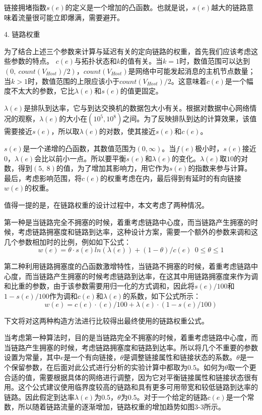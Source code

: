 链接拥堵指数$s(e)$的定义是一个增加的凸函数。也就是说，$s(e)$越大的链路意味着流量很可能立即爆满，需要避开。

4. 链路权重

为了结合上述三个参数来计算与延迟有关的定向链路的权重，首先我们应该考虑这些参数的特点。
$c(e)$与拓扑状态和$k$的值有关。当$k=1$时，数值范围可以达到$(0,\ count(V_{Host})/2)，count(V_{Host})$是网络中可能发起消息的主机节点数量；当$k>1$时，数值范围的上限应该小于$count(V_{Host})/2$。这意味着$c(e)$是一个幅度不太大的参数，它比$\lambda(e)$和$s(e)$的值更固定。

$\lambda(e)$是排队到达率，它与到达交换机的数据包大小有关。根据对数据中心网络情况的观察，$\lambda(e)$的大小在$({10}^5,{10}^8)$之间。为了反映排队到达的计算效果，该值需要接近$s(e)$，所以取$\lambda(e)$的对数，使其接近$s(e)$和$c(e)$。

$s(e)$是一个递增的凸函数，其数值范围为$\left(0,\infty\right)$。当$f(e)$极小时，$s(e)$接近0，$\lambda(e)$会比以前小一点。所以要平衡$s(e)$和$\lambda(e)$的变化。$\lambda(e)$取$10$的对数，得到$\left(5,\ 8\right)$的值，为了增加其影响力，用它作为$s(e)$的指数来参与计算。最后，考虑影响范围，将$c(e)$的权重考虑在内，最后得到有延时的有向链接$w(e)$的权重。

值得一提的是，在链路权重的设计过程中，本文考虑了两种情况。

第一种是当链路完全不拥塞的时候，着重考虑链路中心度，而当链路产生拥塞的时候，考虑链路拥塞度和链路到达率，这种设计方案，需要一个额外的参数来调和这几个参数相加时的比例，例如如下公式：
$$w(e)=\theta \cdot s(e)ln(λ(e)) +(1- \theta )/c(e) \ \  0 \le \theta \le 1$$

第二种利用链路拥塞度的凸函数激增特性，当链路不拥塞的时候，着重考虑链路中心度，而当链路产生拥塞的时候考虑链路到达率，在这其中用链路拥塞度来作为调和比重的参数，由于该参数需要用归一化的方式调和，因此将$s(e)/100$和$1-s(e)/100$作为调和$c(e)$和$\lambda(e)$的系数，如下公式所示：
$$w(e) = c(e) \cdot (e)/100 + \lambda(e) \cdot (1-s(e)/100)$$

下文将对这两种构造方法进行比较得出最终使用的链路权重公式。

当考虑第一种算法时，目的是当链路完全不拥塞的时候，着重考虑链路中心度，而当链路产生拥塞的时候，考虑链路拥塞度和链路到达率。所以将几个不重要的参数设置为常量，其中$e$是一个有向链接，$\theta$是调整链接属性和链接状态的系数。$\theta$是一个保留参数，在后面对此公式进行分析的实验计算中都取为$0.5$。如何为$\theta$取一个更合适的值，需要根据具体的网络进行调整，因为它对平衡链接属性和链接状态很有用。这个公式建议使用临界度较高的链路和具有更多可用带宽和较低链路到达率的链路。因此假定到达率$\lambda\left(e\right)$为$0.5$，$\theta$为$0.5$。对于一个给定的链路$c\left(e\right)$是一个常数，所以随着链路流量的逐渐增加，链路权重的增加趋势如图3-3所示。

